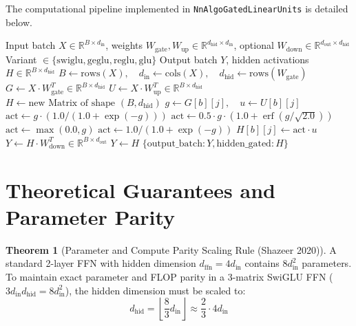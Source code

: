 \documentclass[11pt,a4paper]{article}
\theoremstyle{definition}
\newtheorem{theorem}{Theorem}[section]
\begin{document}
The computational pipeline implemented in \texttt{NnAlgoGatedLinearUnits} is detailed below.

\begin{algorithm}[H]
\caption{Gated Linear Units (SwiGLU/GeGLU/ReGLU) Forward Evaluation}
\begin{algorithmic}[1]
\Require Input batch $X \in \mathbb{R}^{B \times d_{\text{in}}}$, weights $W_{\text{gate}}, W_{\text{up}} \in \mathbb{R}^{d_{\text{hid}} \times d_{\text{in}}}$, optional $W_{\text{down}} \in \mathbb{R}^{d_{\text{out}} \times d_{\text{hid}}}$
\Require Variant $\in \{\text{swiglu}, \text{geglu}, \text{reglu}, \text{glu}\}$
\Ensure Output batch $Y$, hidden activations $H \in \mathbb{R}^{B \times d_{\text{hid}}}$
\State $B \gets \text{rows}(X), \quad d_{\text{in}} \gets \text{cols}(X), \quad d_{\text{hid}} \gets \text{rows}(W_{\text{gate}})$
\State $G \gets X \cdot W_{\text{gate}}^T \in \mathbb{R}^{B \times d_{\text{hid}}}$
\State $U \gets X \cdot W_{\text{up}}^T \in \mathbb{R}^{B \times d_{\text{hid}}}$
\State $H \gets \text{new Matrix of shape } (B, d_{\text{hid}})$
        \State $g \gets G[b][j], \quad u \gets U[b][j]$
            \State $\text{act} \gets g \cdot (1.0 / (1.0 + \exp(-g)))$
            \State $\text{act} \gets 0.5 \cdot g \cdot (1.0 + \operatorname{erf}(g / \sqrt{2.0}))$
            \State $\text{act} \gets \max(0.0, g)$
            \State $\text{act} \gets 1.0 / (1.0 + \exp(-g))$
        \EndIf
        \State $H[b][j] \gets \text{act} \cdot u$
    \EndFor
\EndFor
{}
    \State $Y \gets H \cdot W_{\text{down}}^T \in \mathbb{R}^{B \times d_{\text{out}}}$
\Else
    \State $Y \gets H$
\EndIf
\State \Return $\{\text{output\_batch}: Y, \text{hidden\_gated}: H\}$
\end{algorithmic}
\end{algorithm}

\section{Theoretical Guarantees and Parameter Parity}

\begin{theorem}[Parameter and Compute Parity Scaling Rule (Shazeer 2020)]
A standard 2-layer FFN with hidden dimension $d_{\text{ffn}} = 4 d_{\text{in}}$ contains $8 d_{\text{in}}^2$ parameters. To maintain exact parameter and FLOP parity in a 3-matrix SwiGLU FFN ($3 d_{\text{in}} d_{\text{hid}} = 8 d_{\text{in}}^2$), the hidden dimension must be scaled to:
\begin{equation}
d_{\text{hid}} = \left\lfloor \frac{8}{3} d_{\text{in}} \right\rfloor \approx \frac{2}{3} \cdot 4 d_{\text{in}}
\end{equation}
\end{theorem}
\end{document}
